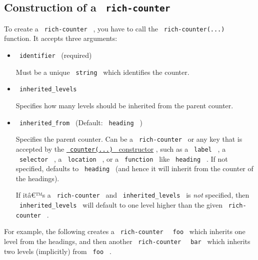 
\subsection{\texorpdfstring{Construction of a
\texttt{\ rich-counter\ }}{Construction of a  rich-counter }}\label{construction-of-a-rich-counter}

To create a \texttt{\ rich-counter\ } , you have to call the
\texttt{\ rich-counter(...)\ } function. It accepts three arguments:

\begin{itemize}
\item
  \texttt{\ identifier\ } (required)

  Must be a unique \texttt{\ string\ } which identifies the counter.
\item
  \texttt{\ inherited\_levels\ }

  Specifies how many levels should be inherited from the parent counter.
\item
  \texttt{\ inherited\_from\ } (Default: \texttt{\ heading\ } )

  Specifies the parent counter. Can be a \texttt{\ rich-counter\ } or
  any key that is accepted by the
  \href{https://typst.app/docs/reference/introspection/counter\#constructor}{\texttt{\ counter(...)\ }
  constructor} , such as a \texttt{\ label\ } , a \texttt{\ selector\ }
  , a \texttt{\ location\ } , or a \texttt{\ function\ } like
  \texttt{\ heading\ } . If not specified, defaults to
  \texttt{\ heading\ } (and hence it will inherit from the counter of
  the headings).

  If itâ€™s a \texttt{\ rich-counter\ } and
  \texttt{\ inherited\_levels\ } is \emph{not} specified, then
  \texttt{\ inherited\_levels\ } will default to one level higher than
  the given \texttt{\ rich-counter\ } .
\end{itemize}

For example, the following creates a \texttt{\ rich-counter\ }
\texttt{\ foo\ } which inherits one level from the headings, and then
another \texttt{\ rich-counter\ } \texttt{\ bar\ } which inherits two
levels (implicitly) from \texttt{\ foo\ } .

\begin{Shaded}
\begin{Highlighting}[]

\end{Highlighting}
\end{Shaded}

